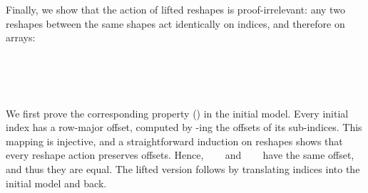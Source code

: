 Finally, we show that the action of lifted reshapes is proof-irrelevant: any two
reshapes between the same shapes act identically on indices, and therefore on
arrays:
\begin{code}%
%
\>[2]%
\>[16]\AgdaSymbol{:}\AgdaSpace{}%
\AgdaSymbol{(}\AgdaSpace{}%
\AgdaSpace{}%
\AgdaSymbol{:}\AgdaSpace{}%
\AgdaSpace{}%
\AgdaSpace{}%
\AgdaSymbol{)}\AgdaSpace{}%
\AgdaSymbol{(}\AgdaSpace{}%
\AgdaSymbol{:}\AgdaSpace{}%
\AgdaSpace{}%
\AgdaSpace{}%
\AgdaSpace{}%
\AgdaSymbol{)}\<%
\\
%
\>[16]\AgdaSpace{}%
\AgdaSpace{}%
\AgdaSpace{}%
\AgdaSpace{}%
\AgdaSpace{}%
\AgdaSpace{}%
\AgdaSpace{}%
\AgdaSpace{}%
\AgdaSpace{}%
\AgdaSpace{}%
\AgdaSpace{}%
\AgdaSpace{}%
\AgdaSpace{}%
\<%
\\
%
\>[2]%
\>[16]\AgdaSymbol{:}\AgdaSpace{}%
\AgdaSymbol{(}\AgdaSpace{}%
\AgdaSpace{}%
\AgdaSymbol{:}\AgdaSpace{}%
\AgdaSpace{}%
\AgdaSpace{}%
\AgdaSymbol{)}\AgdaSpace{}%
\AgdaSymbol{(}\AgdaSpace{}%
\AgdaSymbol{:}\AgdaSpace{}%
\AgdaSpace{}%
\AgdaSpace{}%
\AgdaSpace{}%
\AgdaSpace{}%
\AgdaSymbol{)}\<%
\\
%
\>[16]\AgdaSpace{}%
\AgdaSpace{}%
\AgdaSpace{}%
\AgdaSpace{}%
\AgdaSpace{}%
\AgdaSpace{}%
\AgdaSpace{}%
\AgdaSpace{}%
\AgdaSpace{}%
\AgdaSpace{}%
\AgdaSpace{}%
\<%
\end{code}
We first prove the corresponding property () in the initial
model.  Every initial index has a row-major offset, computed by
-ing the offsets of its sub-indices.  This mapping is injective, and
a straightforward induction on reshapes shows that every reshape action
preserves offsets.  Hence, ~~~ and
~~~ have the same offset, and thus they are equal.
The lifted version follows by translating indices into the initial model and
back.

